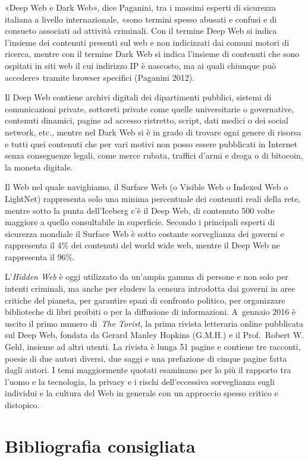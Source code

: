 \documentclass[
  b5paper,
  twoside,
  11pt,
  chapterprefix=false,
  bibliography=totocnumbered,
  listof=flat]{scrbook}
\begin{document}
«Deep Web e Dark Web», dice Paganini, tra i massimi esperti di sicurezza
italiana a livello internazionale, «sono termini spesso abusati e
confusi e di consueto associati ad attività criminali. Con il termine
Deep Web si indica l'insieme dei contenuti presenti sul web e non
indicizzati dai comuni motori di ricerca, mentre con il termine Dark Web
si indica l'insieme di contenuti che sono ospitati in siti web il cui
indirizzo IP è nascosto, ma ai quali chiunque può accedere» tramite
browser specifici (Paganini 2012).

Il Deep Web contiene archivi digitali dei dipartimenti pubblici, sistemi
di comunicazioni private, sottoreti private come quelle universitarie o
governative, contenuti dinamici, pagine ad accesso ristretto, script,
dati medici o dei social network, etc., mentre nel Dark Web si è in
grado di trovare ogni genere di risorsa e tutti quei contenuti che per
vari motivi non posso essere pubblicati in Internet senza conseguenze
legali, come merce rubata, traffici d'armi e droga o di bitocoin, la
moneta digitale.

Il Web nel quale navighiamo, il Surface Web (o Visible Web o Indexed Web
o LightNet) rappresenta solo una minima percentuale dei contenuti reali
della rete, mentre sotto la punta dell'Iceberg c'è il Deep Web, di
contenuto 500 volte maggiore a quello consultabile in superficie.
Secondo i principali esperti di sicurezza mondiale il Surface Web è
sotto costante sorveglianza dei governi e rappresenta il 4\% dei
contenuti del world wide web, mentre il Deep Web ne rappresenta il 96\%.

L'\emph{Hidden Web} è oggi utilizzato da un'ampia gamma di persone e non solo
per intenti criminali, ma anche per eludere la censura introdotta dai
governi in aree critiche del pianeta, per garantire spazi di confronto
politico, per organizzare biblioteche di libri proibiti o per la
diffusione di informazioni. A~gennaio 2016 è uscito il primo numero
di~\emph{The Torist}, la prima rivista letteraria online pubblicata sul Deep
Web, fondata da Gerard Manley Hopkins (G.M.H.) e il Prof.~Robert W.
Gehl, insieme ad altri utenti. La rivista è lunga 51 pagine e contiene
tre racconti, poesie di due autori diversi, due saggi e una prefazione
di cinque pagine fatta dagli autori. I temi maggiormente quotati
esaminano per lo più il rapporto tra l'uomo e la tecnologia, la privacy
e i rischi dell'eccessiva sorveglianza sugli individui e la cultura del
Web in generale con un approccio spesso critico e distopico.

\hypertarget{bibliografia-consigliata-11}{%
\section*{Bibliografia consigliata}\label{bibliografia-consigliata-11}}
\end{document}
